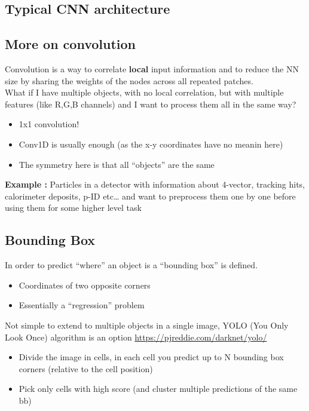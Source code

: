 \subsection{Typical CNN architecture}


\subsection{More on convolution}

Convolution is a way to correlate \textbf{local} input information and to reduce the NN size by sharing the weights of the nodes across all repeated patches.\\

What if I have multiple objects, with no local correlation, but with multiple features (like R,G,B channels) and I want to process them all in the same way?
\begin{itemize}
	\item 1x1 convolution!
	\item Conv1D is usually enough (as the x-y coordinates have no meanin here)
	\item The symmetry here is that all “objects” are the same
\end{itemize}

\textbf{Example :} Particles in a detector with information about 4-vector, tracking hits, calorimeter deposits, p-ID etc… and want to preprocess them one by one before using them for some higher level task


\subsection{Bounding Box}
In order to predict “where” an object is a “bounding box” is defined.
\begin{itemize}
	\item Coordinates of two opposite corners
	\item Essentially a “regression” problem
\end{itemize}

Not simple to extend to multiple objects in a single image, YOLO (You Only Look Once) algorithm is an option \url{https://pjreddie.com/darknet/yolo/}\\
\begin{itemize}
	\item Divide the image in cells, in each cell you predict up to N bounding box corners (relative to the cell position) 
	\item Pick only cells with high score (and cluster multiple predictions of the same bb)
\end{itemize}

